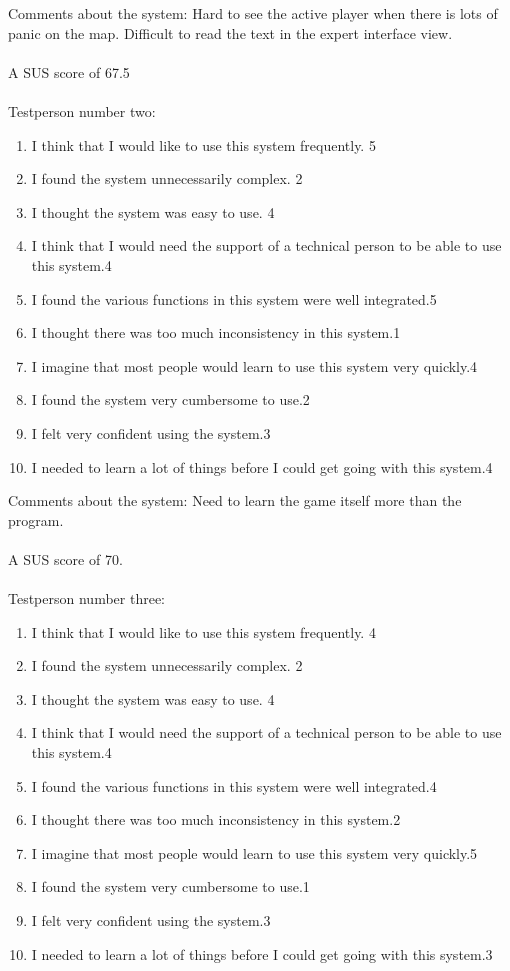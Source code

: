 Comments about the system: Hard to see the active player when there is lots of panic on the map. Difficult to read the text in the expert interface view.\\
\\
A SUS score of 67.5\\
\\
Testperson number two:
\begin{enumerate} \setlength{\itemsep}{0cm}\setlength{\parskip}{0cm}
	\item I think that I would like to use this system frequently. \hfill 5 
	\item I found the system unnecessarily complex. \hfill 2
	\item I thought the system was easy to use. \hfill 4
	\item I think that I would need the support of a technical person to be able to use this system.\hfill 4
	\item I found the various functions in this system were well integrated.\hfill 5
	\item I thought there was too much inconsistency in this system.\hfill 1
	\item I imagine that most people would learn to use this system very quickly.\hfill 4
	\item I found the system very cumbersome to use.\hfill 2
	\item I felt very confident using the system.\hfill 3
	\item I needed to learn a lot of things before I could get going with this system.\hfill 4
\end{enumerate}

Comments about the system: Need to learn the game itself more than the program.\\
\\
A SUS score of 70.\\
\\
Testperson number three:

\begin{enumerate} \setlength{\itemsep}{0cm}\setlength{\parskip}{0cm}
	\item I think that I would like to use this system frequently. \hfill 4
	\item I found the system unnecessarily complex. \hfill 2
	\item I thought the system was easy to use. \hfill 4
	\item I think that I would need the support of a technical person to be able to use this system.\hfill 4
	\item I found the various functions in this system were well integrated.\hfill 4
	\item I thought there was too much inconsistency in this system.\hfill 2
	\item I imagine that most people would learn to use this system very quickly.\hfill 5
	\item I found the system very cumbersome to use.\hfill 1
	\item I felt very confident using the system.\hfill 3
	\item I needed to learn a lot of things before I could get going with this system.\hfill 3
\end{enumerate}

